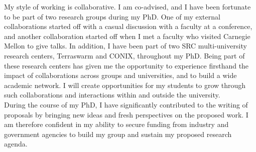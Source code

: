 \documentclass[10pt]{article}
\begin{document}
My style of working is collaborative. 
I am co-advised, and I have been fortunate to be part of two research groups during my PhD. One of my external collaborations started off with a casual discussion with a faculty at a conference, and another collaboration started off when I met a faculty who visited Carnegie Mellon to give talks. %
In addition, I have been part of two SRC multi-university research centers, Terraswarm and CONIX, throughout my PhD. Being part of these research centers has given me the opportunity to experience firsthand the impact of collaborations across groups and universities, and to build a wide academic network. I will create opportunities for my students to grow through such collaborations and interactions within and outside the university.  \\


During the course of my PhD, I have significantly contributed to the writing of proposals by bringing new ideas and fresh perspectives on the proposed work. I am therefore confident in my ability to secure funding from industry and government agencies to build my group and sustain my proposed research agenda.  %





\end{document}
